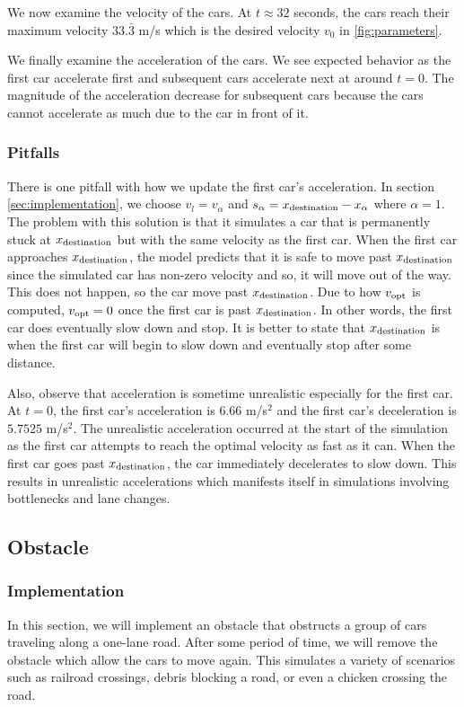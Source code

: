 \documentclass[12pt]{article}
\begin{document}
      We now examine the velocity of the cars. At $t \approx 32$ seconds, the cars reach their maximum velocity $33.\bar{3}$ m/s which is the desired velocity $v_0$ in \ref{fig:parameters}. 

      We finally examine the acceleration of the cars. We see expected behavior as the first car accelerate first and subsequent cars accelerate next at around $t=0$. The magnitude of the acceleration decrease for subsequent cars because the cars cannot accelerate as much due to the car in front of it. 
    \subsubsection{Pitfalls}\label{sec:homogeneous_pitfal}
    There is one pitfall with how we update the first car's acceleration. In section \ref{sec:implementation}, we choose $v_l = v_\alpha$ and $s_\alpha = x_{\rm destination} - x_\alpha$ where $\alpha = 1$. The problem with this solution is that it simulates a car that is permanently stuck at $x_{\rm destination}$ but with the same velocity as the first car. When the first car approaches $x_{\rm destination}$, the model predicts that it is safe to move past $x_{\rm destination}$ since the simulated car has non-zero velocity and so, it will move out of the way. This does not happen, so the car move past $x_{\rm destination}$. Due to how $v_{\rm opt}$ is computed, $v_{\rm opt}=0$ once the first car is past $x_{\rm destination}$. In other words, the first car does eventually slow down and stop. It is better to state that $x_{\rm destination}$ is when the first car will begin to slow down and eventually stop after some distance.  
      
    Also, observe that acceleration is sometime unrealistic especially for the first car. At $t=0$, the first car's acceleration is $6.66$ m/s$^2$ and the first car's deceleration is $5.7525$ m/s$^2$. The unrealistic acceleration occurred at the start of the simulation as the first car attempts to reach the optimal velocity as fast as it can. When the first car goes past $x_{\rm destination}$, the car immediately decelerates to slow down. This results in unrealistic accelerations which manifests itself in simulations involving bottlenecks and lane changes. 
    \subsection{Obstacle}
    \subsubsection{Implementation}\label{sec:obsImplementation}
    In this section, we will implement an obstacle that obstructs a group of cars traveling along a one-lane road. After some period of time, we will remove the obstacle which allow the cars to move again.  This simulates a variety of scenarios such as railroad crossings, debris blocking a road, or even a chicken crossing the road. 
\end{document}
